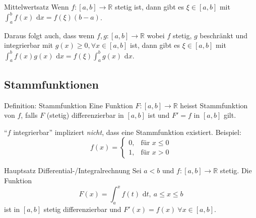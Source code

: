 \documentclass[a4paper,10pt]{article}
\def\R{\mathbb{R}}
\def\dx{\text{ d}x}
\begin{document}
\begin{mainbox}{Mittelwertsatz}
 Wenn $f: [a,b] \to \R$ stetig ist, dann gibt es $\xi \in [a,b]$ mit $\int_a^b f(x) \dx = f(\xi) (b-a)$.
\end{mainbox}
Daraus folgt auch, dass wenn $f,g: [a,b] \to \R$ wobei $f$ stetig, $g$ beschränkt und integrierbar mit $g(x) \ge 0, \forall x \in [a,b]$ ist, dann gibt es $\xi \in [a,b]$ mit $\int_a^b f(x)g(x) \dx = f(\xi) \int_a^b g(x) \dx$.

\subsection{Stammfunktionen}
\begin{subbox}{Definition: Stammfunktion}
 Eine Funktion $F: [a,b] \to \R$ heisst Stammfunktion von $f$, falls $F$ (stetig) differenzierbar in $[a,b]$ ist und $F' = f$ in $[a,b]$ gilt.
\end{subbox}
``$f$ integrierbar'' impliziert \textit{nicht}, dass eine Stammfunktion existiert. Beispiel:
$$
 f(x) = \begin{cases}
        0, & \text{für } x \le 0 \\
        1, & \text{für } x > 0
        \end{cases}
$$

\begin{mainbox}{Hauptsatz Differential-/Integralrechnung}
 Sei $a<b$ und $f: [a,b] \to \R$ stetig. Die Funktion 
 $$F(x) = \int_a^x f(t) \text{ d}t, \ a \le x \le b$$
 ist in $[a,b]$ stetig differenzierbar und $F'(x) = f(x) \ \forall x \in [a,b]$.
\end{mainbox}
\end{document}
